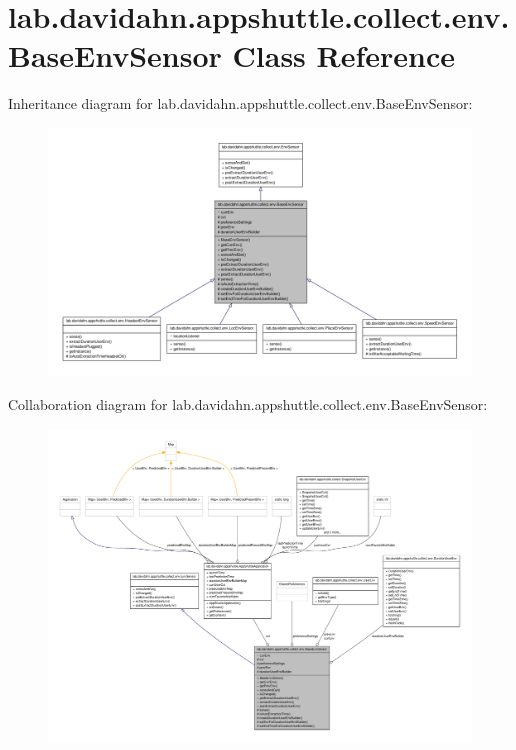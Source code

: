 \hypertarget{classlab_1_1davidahn_1_1appshuttle_1_1collect_1_1env_1_1_base_env_sensor}{\section{lab.\-davidahn.\-appshuttle.\-collect.\-env.\-Base\-Env\-Sensor \-Class \-Reference}
\label{classlab_1_1davidahn_1_1appshuttle_1_1collect_1_1env_1_1_base_env_sensor}
}


\-Inheritance diagram for lab.\-davidahn.\-appshuttle.\-collect.\-env.\-Base\-Env\-Sensor\-:
\nopagebreak
\begin{figure}[H]
\begin{center}
\leavevmode
\includegraphics[width=350pt]{classlab_1_1davidahn_1_1appshuttle_1_1collect_1_1env_1_1_base_env_sensor__inherit__graph}
\end{center}
\end{figure}


\-Collaboration diagram for lab.\-davidahn.\-appshuttle.\-collect.\-env.\-Base\-Env\-Sensor\-:
\nopagebreak
\begin{figure}[H]
\begin{center}
\leavevmode
\includegraphics[width=350pt]{classlab_1_1davidahn_1_1appshuttle_1_1collect_1_1env_1_1_base_env_sensor__coll__graph}
\end{center}
\end{figure}
